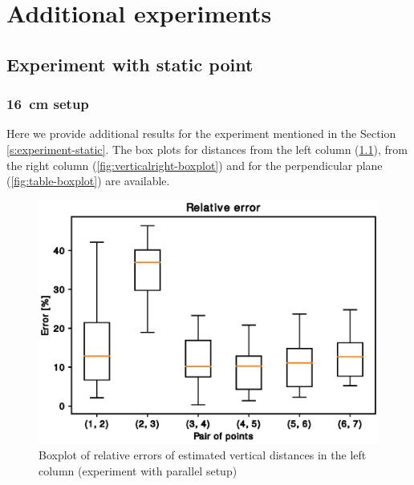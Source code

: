 \chapter{Additional experiments}

\section{Experiment with static point}

\subsection*{16~cm setup}
\label{ss:16results}
Here we provide additional results for the experiment mentioned in the Section
\ref{s:experiment-static}. The box plots for distances from the left column
(\ref{fig:verticalleft-boxplot}), from the right column
(\ref{fig:verticalright-boxplot}) and for the perpendicular plane
(\ref{fig:table-boxplot}) are available.

\begin{figure}
\includegraphics[width=\linewidth]{experiments/leftcolumn1.eps}
\caption{Boxplot of relative errors of estimated vertical distances in the left column (experiment with parallel setup)}
\label{fig:verticalleft-boxplot}
\end{figure}

